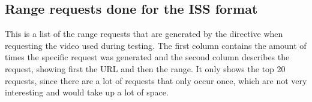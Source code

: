 \documentclass[twoside,openright]{uva-bachelor-thesis}
\begin{document}
\printbibliography[heading=bibintoc]{}

\printglossaries{}
\begin{appendices}
    \chapter{Range requests done for the ISS format}\label{ap:log}
    This is a list of the range requests that are generated by the \ipplong
    directive when requesting the video used during testing. The first column
    contains the amount of times the specific request was generated and the
    second column describes the request, showing first the URL and then the
    range. It only shows the top 20 requests, since there are a lot of requests
    that only occur once, which are not very interesting and would take up a lot
    of space.
\end{appendices}
\end{document}
